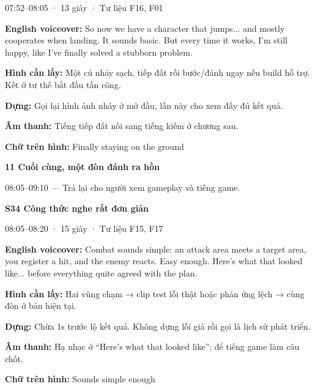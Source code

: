 \documentclass[10pt,a4paper]{article}
\begin{document}
07:52–08:05 · 13 giây · Tư liệu F16, F01\par

\textbf{English voiceover:}  So now we have a character that jumps... and mostly cooperates when landing. It sounds basic. But every time it works, I’m still happy, like I’ve finally solved a stubborn problem.\par

\textbf{Hình cần lấy:}  Một cú nhảy sạch, tiếp đất rồi bước/đánh ngay nếu build hỗ trợ. Kết ở tư thế bắt đầu tấn công.\par

\textbf{Dựng:}  Gọi lại hình ảnh nhảy ở mở đầu, lần này cho xem đầy đủ kết quả.\par

\textbf{Âm thanh:}  Tiếng tiếp đất nối sang tiếng kiếm ở chương sau.\par

\textbf{Chữ trên hình:}  Finally staying on the ground\par

\textbf{11 Cuối cùng, một đòn đánh ra hồn}\par

08:05–09:10 — Trả lại cho người xem gameplay và tiếng game.\par

\textbf{S34 Công thức nghe rất đơn giản}\par

08:05–08:20 · 15 giây · Tư liệu F15, F17\par

\textbf{English voiceover:}  Combat sounds simple: an attack area meets a target area, you register a hit, and the enemy reacts. Easy enough. Here’s what that looked like... before everything quite agreed with the plan.\par

\textbf{Hình cần lấy:}  Hai vùng chạm → clip test lỗi thật hoặc phản ứng lệch → cùng đòn ở bản hiện tại.\par

\textbf{Dựng:}  Chừa 1s trước lộ kết quả. Không dựng lỗi giả rồi gọi là lịch sử phát triển.\par

\textbf{Âm thanh:}  Hạ nhạc ở “Here’s what that looked like”; để tiếng game làm câu chốt.\par

\textbf{Chữ trên hình:}  Sounds simple enough\par
\end{document}
